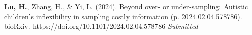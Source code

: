 \newcommand{\Revision}{\textit{Under revision}}
\newcommand{\Review}{\textit{Under review}}
\newcommand{\Submitted}{\textit{Submitted}}
\newcommand{\Manuscript}{\textit{Preparing manuscript}}
\newcommand{\Preprint}{\textit{Preprint}}
\newcommand{\CS}{*} %
\newcommand{\CF}{\textsuperscript{\#}} %
\newcommand{\ME}{\textbf{Lu, H.}}


\begin{etaremune}
  \item \ME, Zhang, H., \& Yi, L. (2024). Beyond over- or under-sampling: Autistic children's inflexibility in sampling costly information (p. 2024.02.04.578786). bioRxiv. https://doi.org/10.1101/2024.02.04.578786 \Submitted
\end{etaremune}
